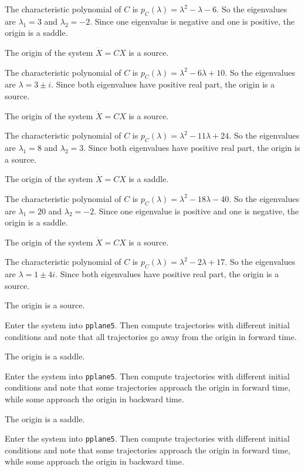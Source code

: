 \documentclass{ximera}
\begin{document}
\soln The characteristic polynomial of $C$ is
$p_C(\lambda) = \lambda^2 - \lambda - 6$.  So the eigenvalues are
$\lambda_1 = 3$ and $\lambda_2 = -2$.  Since one eigenvalue is negative
and one is positive, the origin is a saddle.

 \ans The origin of the system $\dot{X} = CX$ is a source.

\soln The characteristic polynomial of $C$ is
$p_C(\lambda) = \lambda^2 - 6\lambda + 10$.  So the eigenvalues are
$\lambda = 3 \pm i$.  Since both eigenvalues have positive real part,
the origin is a source.

 \ans The origin of the system $\dot{X} = CX$ is a source.

\soln The characteristic polynomial of $C$ is
$p_C(\lambda) = \lambda^2 - 11\lambda + 24$.  So the eigenvalues are
$\lambda_1 = 8$ and $\lambda_2 = 3$.  Since both eigenvalues have
positive real part, the origin is a source.

 \ans The origin of the system $\dot{X} = CX$ is a saddle.

\soln The characteristic polynomial of $C$ is
$p_C(\lambda) = \lambda^2 - 18\lambda - 40$.  So the eigenvalues are
$\lambda_1 = 20$ and $\lambda_2 = -2$.  Since one eigenvalue is positive
and one is negative, the origin is a saddle.

 \ans The origin of the system $\dot{X} = CX$ is a source.

\soln The characteristic polynomial of $C$ is
$p_C(\lambda) = \lambda^2 - 2\lambda + 17$.  So the eigenvalues are
$\lambda = 1 \pm 4i$.  Since both eigenvalues have positive real part,
the origin is a source.

 \ans The origin is a source.

\soln Enter the system into {\tt pplane5}.  Then compute trajectories with
different initial conditions and note that all trajectories go away from
the origin in forward time.

 \ans The origin is a saddle.

\soln Enter the system into {\tt pplane5}.  Then compute trajectories with
different initial conditions and note that some trajectories approach the
origin in forward time, while some approach the origin in backward time.

 \ans The origin is a saddle.

\soln Enter the system into {\tt pplane5}.  Then compute trajectories with
different initial conditions and note that some trajectories approach the
origin in forward time, while some approach the origin in backward time.
\end{document}
